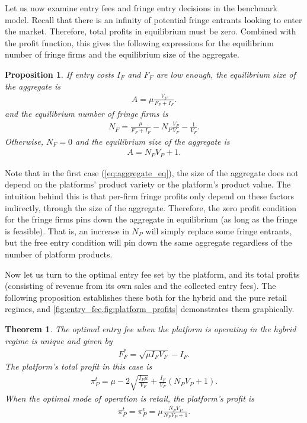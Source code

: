 \documentclass[a4paper]{article}
\newtheorem{proposition}{Proposition}
\newtheorem{theorem}{Theorem}
\begin{document}
Let us now examine entry fees and fringe entry decisions in the benchmark model.
Recall that there is an infinity of potential fringe entrants looking to enter the market.
Therefore, total profits in equilibrium must be zero.
Combined with the  profit function, this gives the following expressions for the equilibrium number of fringe firms and the equilibrium size of the aggregate.
\begin{proposition}
    \label{prop:equilibrium_aggregate}
    If entry costs $I_F$ and $F_F$ are low enough, the equilibrium size of the aggregate is
    \begin{align}
        A = \mu \frac{V_F}{F_F + I_F}.
        \label{eq:aggregate_eq}
    \end{align}
    and the equilibrium number of fringe firms is
    \begin{align*}
        N_F = \frac{\mu}{F_F + I_F} - N_P \frac{V_P}{V_F} - \frac{1}{V_F}.
    \end{align*}
    Otherwise,  $N_F = 0$ and the equilibrium size of the aggregate is
    \begin{align*}
        A = N_P V_P + 1.
    \end{align*}
\end{proposition}
Note that in the first case (\cref{eq:aggregate_eq}), the size of the aggregate does not depend on the platforms' product variety or the platform's product value.
The intuition behind this is that per-firm fringe profits only depend on these factors indirectly, through the size of the aggregate.
Therefore, the zero profit condition for the fringe firms pins down the aggregate in equilibrium (as long as the fringe is feasible).
That is, an increase in $N_P$ will simply replace some fringe entrants, but the free entry condition will pin down the same aggregate regardless of the number of platform products.

Now let us turn to the optimal entry fee set by the platform, and its total profits (consisting of revenue from its own sales and the collected entry fees).
The following proposition establishes these both for the hybrid and the pure retail regimes, and \cref{fig:entry_fee,fig:platform_profits} demonstrates them graphically.

\begin{theorem}
    \label{prop:optimal_entry_fee}
    The optimal entry fee when the platform is operating in the hybrid regime is unique and given by
    \begin{align*}
        F_F^* = \sqrt{\mu I_F V_F} - I_F.
    \end{align*}
    The platform's total profit in this case is
    \begin{align*}
        \pi_P^{t} = \mu - 2\sqrt{\frac{I_F \mu}{V_F}} + \frac{I_F}{V_F} (N_P V_P + 1).
    \end{align*}
    When the optimal mode of operation is retail, the platform's profit is
    \begin{align*}
        \pi_P^{t} = \pi_P^{v} = \mu \frac{ N_P V_P}{N_P V_P + 1}.
    \end{align*}
\end{theorem}
\end{document}
